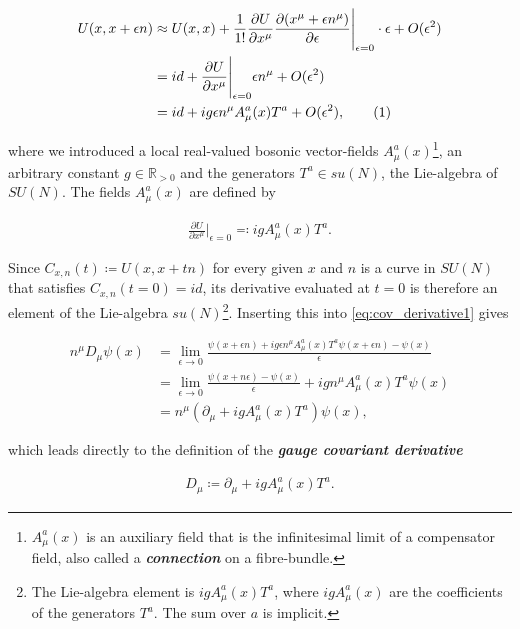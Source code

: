 \documentclass{article}
\newcommand\numberthis{\addtocounter{equation}{1}\tag{\theequation}}
\theoremstyle{plain} %
\theoremstyle{convention} %
\theoremstyle{remark} %
\def\df#1{\textbf{\textit{#1}}}
\numberwithin{equation}{section}
\begin{document}
\begin{align*}
    U(x,x + \epsilon n) &\approx U(x,x) + \frac{1}{1!} \frac{ \partial U }{ \partial x^{\mu} } \frac{ \partial (x^{\mu} + \epsilon n^{\mu}) }{ \partial \epsilon } \Biggr \rvert_{\epsilon = 0} \cdot \epsilon + O(\epsilon^2) \\
    &= id + \frac{ \partial U }{ \partial x^{\mu} } \Biggr \rvert_{\epsilon = 0} \epsilon n^{\mu} + O(\epsilon^2) \\
    &= id + i g \epsilon n^{\mu} A_{\mu}^a(x) T^a + O(\epsilon^2), \numberthis \label{eq:compensator1}
\end{align*}

where we introduced a local real-valued bosonic vector-fields $A_{\mu}^a(x)$\footnote{$A_{\mu}^a(x)$ is an auxiliary field that is the infinitesimal limit of a compensator field, also called a \df{connection} on a fibre-bundle.}, an arbitrary constant $g \in \mathbb{R}_{>0}$ and the generators $T^a \in su(N)$, the Lie-algebra of $SU(N)$. The fields $A_{\mu}^a(x)$ are defined by

\begin{align*}
    \frac{ \partial U }{ \partial x^{\mu} } \Biggr \rvert_{\epsilon = 0} \eqqcolon ig A_{\mu}^a(x) T^a.
\end{align*}

Since $C_{x,n}(t) \coloneqq U(x, x + t n)$ for every given $x$ and $n$ is a curve in $SU(N)$ that satisfies $C_{x,n}(t=0) = id$, its derivative evaluated at $t = 0$ is therefore an element of the Lie-algebra $su(N)$\footnote{The Lie-algebra element is $ig A_{\mu}^a(x) T^a$, where $ig A_{\mu}^a(x)$ are the coefficients of the generators $T^a$. The sum over $a$ is implicit.}. Inserting this into \eqref{eq:cov_derivative1} gives

\begin{align*}
    n^{\mu} D_{\mu} \psi(x) &= \lim_{\epsilon \to 0} \frac{ \psi(x + \epsilon n) + i g \epsilon n^{\mu} A_{\mu}^a(x) T^a \psi(x + \epsilon n) - \psi(x) }{\epsilon} \\
    &= \lim_{\epsilon \to 0} \frac{ \psi(x + n \epsilon) - \psi(x) }{\epsilon} + ig n^{\mu} A_{\mu}^a(x) T^a \psi(x) \\
    &= n^{\mu} \left( \partial_{\mu} + ig A_{\mu}^a(x) T^a \right) \psi(x),
\end{align*}

which leads directly to the definition of the \df{gauge covariant derivative}

\begin{align}
    D_{\mu} \coloneqq \partial_{\mu} + ig A_{\mu}^a(x) T^a. \label{eq:cov_derivative}
\end{align}
\end{document}
